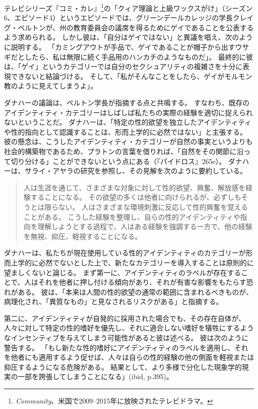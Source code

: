 \documentclass[paper=a4,book,openany]{jlreq} \usepackage{mystyle}
\begin{document}
テレビシリーズ『コミ・カレ』\footnote{\emph{Community}、米国で2009--2015年に放映されたテレビドラマ。}の「クィア理論と上級ワックスがけ」（シーズン6、エピソード4）というエピソードでは、グリーンデールカレッジの学長クレイグ・ペルトンが、州の教育委員会の議席を得るためにゲイであることを公表するよう求められる。
しかし彼は、「自分はゲイではない」と異議を唱え、次のように説明する。
「カミングアウトが手品で、ゲイであることが帽子から出すウサギだとしたら、私は無限に続く手品用のハンカチのようなものだ」。
最終的に彼は、「ゲイ」というカテゴリーでは自分のセクシュアリティの複雑さを十分に表現できないと結論づける。
そして、「私がそんなことをしたら、ゲイがモルモン教のように見えてしまうよ」。

ダナハーの議論は、ペルトン学長が指摘する点と共鳴する。
すなわち、既存のアイデンティティ・カテゴリーはしばしば私たちの実際の経験を適切に捉えられないということだ。
ダナハーは、「特定の性的欲望を独立したアイデンティティや性的指向として認識することは、形而上学的に必然ではない」と主張する\citep[p.393]{danaher20:_sexual}。
彼の懸念は、こうしたアイデンティティ・カテゴリーが自然の事実というよりも社会的構築物であるため、プラトンの言葉を借りれば、「自然をその関節に沿って切り分ける」ことができないという点にある（『パイドロス』265e）。
ダナハーは、サライ・アヤラの研究\citep{ayala18:_sexual_orien_choic}を参照し、その見解を次のように要約している。

\begin{quote}
人は生涯を通じて、さまざまな対象に対して性的欲望、興奮、解放感を経験することになる。
その欲望の多くは他者に向けられるが、必ずしもそうとは限らない。
人はさまざまな環境刺激に反応して性的興奮を覚えることがある。
こうした経験を整理し、自らの性的アイデンティティや指向を理解しようとする過程で、人はある経験を強調する一方で、他の経験を無視、抑圧、軽視することになる。
\citep{danaher20:_sexual}
\end{quote}

ダナハーは、私たちが現在使用している性的アイデンティティのカテゴリーが形而上学的に必然でないとした上で、新たなカテゴリーを導入することは原則的に望ましくないと論じる。
まず第一に、アイデンティティのラベルが存在することで、人はそれを他者に押し付ける傾向があり、それが有害な影響をもたらす恐れがある。
彼は、「本来は人間の性的欲望の通常の範囲に含まれるべきものが、病理化され、「異質なもの」と見なされるリスクがある」と指摘する\citep[p.393]{danaher20:_sexual}。

第二に、アイデンティティが自発的に採用された場合でも、その存在自体が、人々に対して特定の性的嗜好を優先し、それに適合しない嗜好を犠牲にするようなインセンティブを与えてしまう可能性があると彼は述べる。
彼は次のように警告する。
「もし新たな性的嗜好にアイデンティティのラベルを適用し、それを他者にも適用するよう促せば、人々は自らの性的経験の他の側面を軽視または抑圧するようになる危険がある。
結果として、より多様で分化した現象学的現実の一部を誇張してしまうことになる」(ibid, p.395)。
\end{document}

